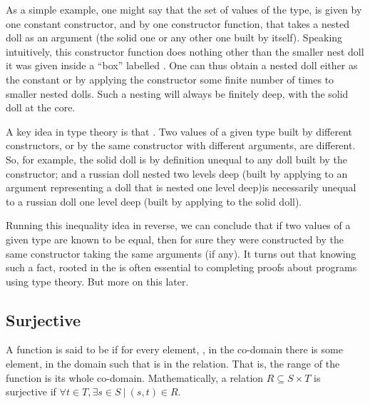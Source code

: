 \documentclass[letterpaper,10pt,english]{sphinxmanual}
\begin{document}
As a simple example, one might say that the set of values of the type,
 is given by one constant constructor,  and
by one constructor function,  that takes a nested doll as an
argument (the solid one or any other one built by  itself).
Speaking intuitively, this constructor function does nothing other
than  the smaller nest doll it was given inside a “box”
labelled .  One can thus obtain a nested doll either as the
constant  or by applying the  constructor some
finite number of times to smaller nested dolls. Such a nesting will
always be finitely deep, with the solid doll at the core.

A key idea in type theory is that . Two
values of a given type built by different constructors, or by the same
constructor with different arguments, are  different. So, for
example, the solid doll is by definition unequal to any doll built by
the  constructor; and a russian doll nested two levels deep
(built by applying  to an argument representing a doll that
is nested one level deep)is necessarily unequal to a russian doll one
level deep (built by applying  to the solid doll).

Running this inequality idea in reverse, we can conclude that if two
values of a given type are known to be equal, then for sure they were
constructed by the same constructor taking the same arguments (if
any).  It turns out that knowing such a fact, rooted in the
 is often essential to completing proofs
about programs using type theory. But more on this later.


\subsection{Surjective}
\label{\detokenize{08-relations:surjective}}
A function is said to be  if for every element, , in
the co-domain there is some element,  in the domain such that
 is in the relation. That is, the range  of the function
is its whole co-domain. Mathematically, a relation \(R \subseteq
S \times T\) is surjective if \(\forall t \in T, \exists s \in
S~|~(s,t) \in R\).
\end{document}
